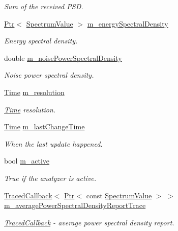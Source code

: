 \begin{DoxyCompactItemize}
\begin{DoxyCompactList}\small\item\em Sum of the received P\+SD. \end{DoxyCompactList}\item 
\hyperlink{classns3_1_1Ptr}{Ptr}$<$ \hyperlink{classns3_1_1SpectrumValue}{Spectrum\+Value} $>$ \hyperlink{classns3_1_1SpectrumAnalyzer_a96ebbaef00134ba6563ef25946a679aa}{m\+\_\+energy\+Spectral\+Density}
\begin{DoxyCompactList}\small\item\em Energy spectral density. \end{DoxyCompactList}\item 
double \hyperlink{classns3_1_1SpectrumAnalyzer_a152e578c6c71cbeb028868a6b13eeec8}{m\+\_\+noise\+Power\+Spectral\+Density}
\begin{DoxyCompactList}\small\item\em Noise power spectral density. \end{DoxyCompactList}\item 
\hyperlink{classns3_1_1Time}{Time} \hyperlink{classns3_1_1SpectrumAnalyzer_a4f5652202cd95f66b350caea4e76ff61}{m\+\_\+resolution}
\begin{DoxyCompactList}\small\item\em \hyperlink{classns3_1_1Time}{Time} resolution. \end{DoxyCompactList}\item 
\hyperlink{classns3_1_1Time}{Time} \hyperlink{classns3_1_1SpectrumAnalyzer_a80271bf4f5d1e289f49dd3261d8b573d}{m\+\_\+last\+Change\+Time}
\begin{DoxyCompactList}\small\item\em When the last update happened. \end{DoxyCompactList}\item 
bool \hyperlink{classns3_1_1SpectrumAnalyzer_a425c27e634215a0d3651a947f7c15e0b}{m\+\_\+active}
\begin{DoxyCompactList}\small\item\em True if the analyzer is active. \end{DoxyCompactList}\item 
\hyperlink{classns3_1_1TracedCallback}{Traced\+Callback}$<$ \hyperlink{classns3_1_1Ptr}{Ptr}$<$ const \hyperlink{classns3_1_1SpectrumValue}{Spectrum\+Value} $>$ $>$ \hyperlink{classns3_1_1SpectrumAnalyzer_a014909438325c07fe2f55a027e3fde90}{m\+\_\+average\+Power\+Spectral\+Density\+Report\+Trace}
\begin{DoxyCompactList}\small\item\em \hyperlink{classns3_1_1TracedCallback}{Traced\+Callback} -\/ average power spectral density report. \end{DoxyCompactList}\end{DoxyCompactItemize}
